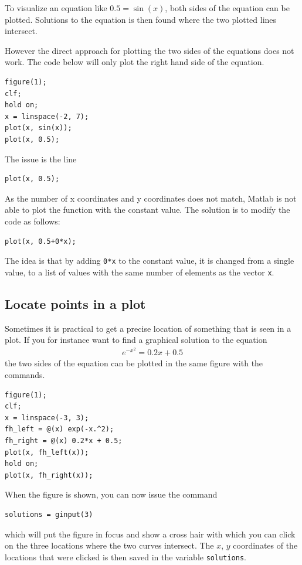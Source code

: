 To visualize an equation like $0.5 = \sin(x)$, 
both sides of the equation can be plotted.
Solutions to the equation is then found 
where the two plotted lines intersect.

However the direct approach for plotting the two sides of the
equations does not work.
The code below will only plot the right hand side of the equation.
\begin{lstlisting}
figure(1);
clf; 
hold on;
x = linspace(-2, 7);
plot(x, sin(x));
plot(x, 0.5);
\end{lstlisting}
The issue is the line
\begin{lstlisting}
plot(x, 0.5);
\end{lstlisting}
As the number of x coordinates and y coordinates does not match, 
Matlab is not able to plot the function with the constant value.
The solution is to modify the code as follows:
\begin{lstlisting}
plot(x, 0.5+0*x);
\end{lstlisting}
The idea is that by adding \verb!0*x! to the constant value, 
it is changed from a single value, to a list of values with the same
number of elements as the vector \verb!x!.



\subsection{Locate points in a plot}
\label{ssecLocatePointsInAPlot}

Sometimes it is practical to get a precise location 
of something that is seen in a plot.
If you for instance want to find a graphical solution to 
the equation
\begin{align*}
e^{-x^2} = 0.2x + 0.5
\end{align*}
the two sides of the equation can be plotted
in the same figure with the commands.
\begin{lstlisting}
figure(1);
clf; 
x = linspace(-3, 3);
fh_left = @(x) exp(-x.^2);
fh_right = @(x) 0.2*x + 0.5;
plot(x, fh_left(x));
hold on;
plot(x, fh_right(x));
\end{lstlisting}
When the figure is shown, you can now issue the command
\begin{lstlisting}
solutions = ginput(3)
\end{lstlisting}
which will put the figure in focus and show a cross hair 
with which you can click on the three locations where the 
two curves intersect.
The $x$,  $y$ coordinates of the locations that were clicked is 
then saved in the variable \verb!solutions!.



